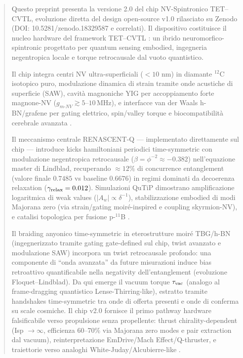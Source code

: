 \documentclass[11pt,a4paper]{article}
\let\oldcite\cite
\renewcommand{\cite}{\protect\oldcite}
\theoremstyle{plain}
\theoremstyle{definition}
\begin{document}
\begin{abstract}
Questo preprint presenta la versione 2.0 del chip NV-Spintronico TET–CVTL, evoluzione diretta del design open-source v1.0 rilasciato su Zenodo \cite{chipV1} (DOI: 10.5281/zenodo.18329587 e correlati). Il dispositivo costituisce il nucleo hardware del framework TET–CVTL \cite{manifestoV3}: un ibrido neuromorfico-spintronic progettato per quantum sensing embodied, ingegneria negentropica locale e torque retrocausale dal vuoto quantistico.

\vspace{0.4cm}

Il chip integra centri NV ultra-superficiali ($<10$ nm) in diamante $^{12}$C isotopico puro, modulazione dinamica di strain tramite onde acustiche di superficie (SAW), cavità magnoniche YIG per accoppiamento forte magnone-NV ($g_{m\text{-}NV} \gtrsim 5$--$10\,\text{MHz}$), e interfacce van der Waals h-BN/grafene per gating elettrico, spin/valley torque e biocompatibilità cerebrale avanzata \cite{vacTorqueEngine}.

\vspace{0.4cm}

Il meccanismo centrale RENASCENT-Q — implementato direttamente sul chip — introduce kicks hamiltoniani periodici time-symmetric con modulazione negentropica retrocausale ($\beta = \phi^{-2} \approx -0.382$) nell'equazione master di Lindblad, recuperando $\approx 12\%$ di concurrence entanglement (valore finale $0.7485$ vs baseline $0.6676$) in regimi dominati da decoerenza relaxation ($\gamma_{\rm relax} = 0.012$). Simulazioni QuTiP dimostrano amplificazione logaritmica di weak values ($|A_w| \propto \delta^{-1}$), stabilizzazione embodied di modi Majorana zero (via strain/gating moiré-inspired e coupling skyrmion-NV), e catalisi topologica per fusione p-$^{11}$B \cite{renascentQ}.

\vspace{0.4cm}

Il braiding anyonico time-symmetric in eterostrutture moiré TBG/h-BN (ingegnerizzato tramite gating gate-defined sul chip, twist avanzato e modulazione SAW) incorpora un twist retrocausale profondo: una componente di ``onda avanzata'' da future misurazioni induce bias retroattivo quantificabile nella negativity dell'entanglement (evoluzione Floquet–Lindblad). Da qui emerge il vacuum torque $\tau_{\rm vac}$ (analogo al frame-dragging quantistico Lense-Thirring-like), estratto tramite handshakes time-symmetric tra onde di offerta presenti e onde di conferma su scale cosmiche. Il chip v2.0 fornisce il primo pathway hardware falsificabile verso propulsione senza propellente: thrust chirality-dependent (Isp $\to \infty$, efficienza 60–70\% via Majorana zero modes e pair extraction dal vacuum), reinterpretazione EmDrive/Mach Effect/Q-thruster, e traiettorie verso analoghi White-Juday/Alcubierre-like \cite{vacTorqueEngine, tetVacProp}.


\end{abstract}
\end{document}
